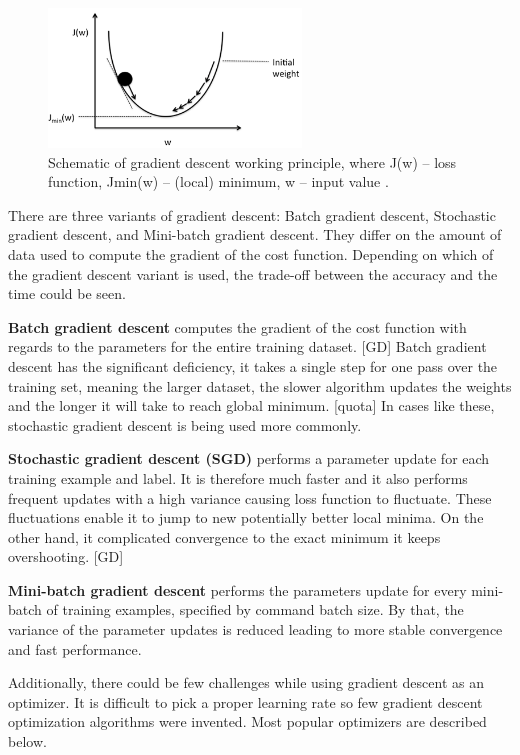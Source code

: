 \begin{figure} [H]
\centering
\includegraphics[width=0.6\textwidth]{figures/GDgraph}
\caption{Schematic of gradient descent working principle, where J(w) – loss function, Jmin(w) – (local) minimum, w – input value \citep{Acquarelli2017}.}
\label{fig:GDgraph}  
\end{figure}

There are three variants of gradient descent: Batch gradient descent, Stochastic gradient descent, and Mini-batch gradient descent. They differ on the amount of data used to compute the gradient of the cost function. Depending on which of the gradient descent variant is used, the trade-off between the accuracy and the time could be seen.

\noindent
\textbf{Batch gradient descent} computes the gradient of the cost function with regards to the parameters for the entire training dataset. [GD] Batch gradient descent has the significant deficiency, it takes a single step for one pass over the training set, meaning the larger dataset, the slower algorithm updates the weights and the longer it will take to reach global minimum. [quota] In cases like these, stochastic gradient descent is being used more commonly.

\noindent
\textbf{Stochastic gradient descent (SGD)} performs a parameter update for each training example and label. It is therefore much faster and it also performs frequent updates with a high variance causing loss function to fluctuate. These fluctuations enable it to jump to new potentially better local minima. On the other hand, it complicated convergence to the exact minimum it keeps overshooting. [GD]

\noindent
\textbf{Mini-batch gradient descent} performs the parameters update for every mini-batch of training examples, specified by command batch size. By that, the variance of the parameter updates is reduced leading to more stable convergence and fast performance.

Additionally, there could be few challenges while using gradient descent as an optimizer. It is difficult to pick a proper learning rate so few gradient descent optimization algorithms were invented. Most popular optimizers are described below.

